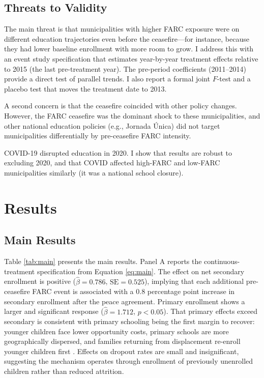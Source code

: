 \documentclass[12pt]{article}
\begin{document}
\subsection{Threats to Validity}

The main threat is that municipalities with higher FARC exposure were on different education trajectories even before the ceasefire---for instance, because they had lower baseline enrollment with more room to grow. I address this with an event study specification that estimates year-by-year treatment effects relative to 2015 (the last pre-treatment year). The pre-period coefficients (2011--2014) provide a direct test of parallel trends. I also report a formal joint $F$-test and a placebo test that moves the treatment date to 2013.

A second concern is that the ceasefire coincided with other policy changes. However, the FARC ceasefire was the dominant shock to these municipalities, and other national education policies (e.g., Jornada {\'U}nica) did not target municipalities differentially by pre-ceasefire FARC intensity.

COVID-19 disrupted education in 2020. I show that results are robust to excluding 2020, and that COVID affected high-FARC and low-FARC municipalities similarly (it was a national school closure).


\section{Results}

\subsection{Main Results}



Table \ref{tab:main} presents the main results. Panel A reports the continuous-treatment specification from Equation \ref{eq:main}. The effect on net secondary enrollment is positive ($\hat{\beta}=0.786$, $\text{SE}=0.525$), implying that each additional pre-ceasefire FARC event is associated with a 0.8 percentage point increase in secondary enrollment after the peace agreement. Primary enrollment shows a larger and significant response ($\hat{\beta}=1.712$, $p<0.05$). That primary effects exceed secondary is consistent with primary schooling being the first margin to recover: younger children face lower opportunity costs, primary schools are more geographically dispersed, and families returning from displacement re-enroll younger children first \citep{shemyakina2011effect}. Effects on dropout rates are small and insignificant, suggesting the mechanism operates through enrollment of previously unenrolled children rather than reduced attrition.
\end{document}
